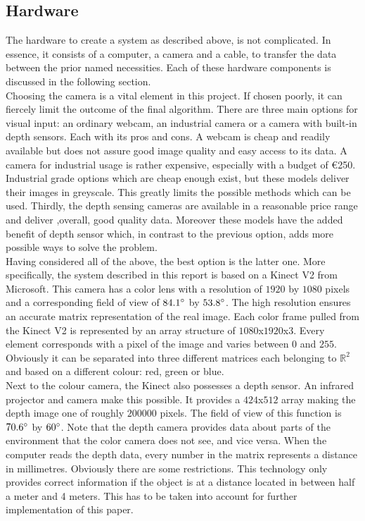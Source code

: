 \documentclass[11pt]{article}
\begin{document}
\subsection{Hardware}
The hardware to create a system as described above, is not complicated. In essence, it consists of a computer, a camera and a cable, to transfer the data between the prior named necessities. Each of these hardware components is discussed in the following section.\\
Choosing the camera is a vital element in this project. If chosen poorly, it can fiercely limit the outcome of the final algorithm. There are three main options for visual input: an ordinary webcam, an industrial camera or a camera with built-in depth sensors. Each with its pros and cons. A webcam is cheap and readily available but does not assure good image quality and easy access to its data. A camera for industrial usage is rather expensive, especially with a budget of \euro 250. Industrial grade options which are cheap enough exist, but these models deliver their images in greyscale. This greatly limits the possible methods which can be used. Thirdly, the depth sensing cameras are available in a reasonable price range and deliver ,overall, good quality data. Moreover these models have the added benefit of depth sensor which, in contrast to the previous option, adds more possible ways to solve the problem.\\
Having considered all of the above, the best option is the latter one. More specifically, the system described in this report is based on a Kinect V2 from Microsoft. This camera has a color lens with a resolution of $1920$ by $1080$ pixels and a corresponding field of view of $84.1\degree$ by $53.8\degree$\cite{kinect_specifications}. The high resolution ensures an accurate matrix representation of the real image. Each color frame pulled from the Kinect V2 is represented by an array structure of $1080$x$1920$x$3$. Every element corresponds with a pixel of the image and varies between $0$ and $255$. Obviously it can be separated into three different matrices each belonging to $\mathbb{R}^{2}$ and based on a different colour: red, green or blue.\\ Next to the colour camera, the Kinect also possesses a depth sensor. An infrared projector and camera make this possible\cite{kinect_v2}. It provides a $424$x$512$ array making the depth image one of roughly $200 000$ pixels. The field of view of this function is $70.6\degree$ by $60\degree$. Note that the depth camera provides data about parts of the environment that the color camera does not see, and vice versa. When the computer reads the depth data, every number in the matrix represents a distance in millimetres. Obviously there are some restrictions. This technology only provides correct information if the object is at a distance located in between half a meter and 4 meters. This has to be taken into account for further implementation of this paper.\\
\end{document}
